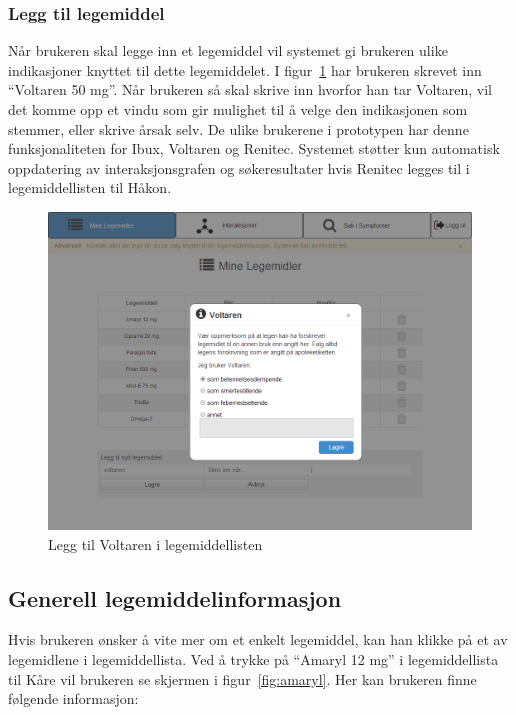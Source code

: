 \subsubsection{Legg til legemiddel}
Når brukeren skal legge inn et legemiddel vil systemet gi brukeren ulike indikasjoner knyttet til dette legemiddelet. I figur~\ref{fig:voltaren} har brukeren skrevet inn “Voltaren 50 mg”. Når brukeren så skal skrive inn hvorfor han tar Voltaren, vil det komme opp et vindu som gir mulighet til å velge den indikasjonen som stemmer, eller skrive årsak selv. De ulike  brukerene i prototypen har denne funksjonaliteten for Ibux, Voltaren og Renitec. Systemet støtter kun automatisk oppdatering av interaksjonsgrafen og søkeresultater hvis Renitec legges til i legemiddellisten til Håkon. 

\begin{figure}[H]
    \centering
    \includegraphics[width=1\textwidth]{fig/utviklingAvPrototype/Voltaren.PNG}
    \caption{Legg til Voltaren i legemiddellisten}
    \label{fig:voltaren}
\end{figure} 

\subsection{Generell legemiddelinformasjon}\label{subsec:generellInfo}
Hvis brukeren ønsker å vite mer om et enkelt legemiddel, kan han klikke på et av legemidlene i legemiddellista. Ved å trykke på “Amaryl 12 mg” i legemiddellista til Kåre vil brukeren se skjermen i figur~\ref{fig:amaryl}. Her kan brukeren finne følgende informasjon:

